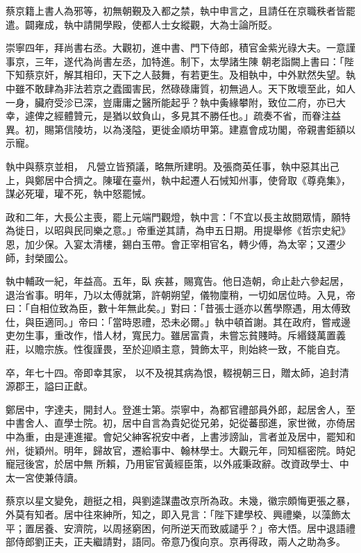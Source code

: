 \begin{pinyinscope}
 蔡京籍上書人為邪等，初無朝覲及入都之禁，執中申言之，且請任在京職秩者皆罷遣。闢雍成，執中請開學殿，使都人士女縱觀，大為士論所貶。



 崇寧四年，拜尚書右丞。大觀初，進中書、門下侍郎，積官金紫光祿大夫。一意謹事京，三年，遂代為尚書左丞，加特進。制下，太學諸生陳
 朝老詣闕上書曰：「陛下知蔡京奸，解其相印，天下之人鼓舞，有若更生。及相執中，中外默然失望。執中雖不敢肆為非法若京之蠹國害民，然碌碌庸質，初無過人。天下敗壞至此，如人一身，臟府受沴已深，豈庸庸之醫所能起乎？執中夤緣攀附，致位二府，亦已大幸，遽俾之經體贊元，是猶以蚊負山，多見其不勝任也。」疏奏不省，而眷注益異。初，賜第信陵坊，以為淺隘，更徙金順坊甲第。建嘉會成功閣，帝親書鉅額以示寵。



 執中與蔡京並相，
 凡營立皆預議，略無所建明。及張商英任事，執中惡其出己上，與鄭居中合擠之。陳瓘在臺州，執中起遷人石悈知州事，使脅取《尊堯集》，謀必死瓘，瓘不死，執中怒罷悈。



 政和二年，大長公主喪，罷上元端門觀燈，執中言：「不宜以長主故閼眾情，願特為徙日，以昭與民同樂之意。」帝重逆其請，為申五日期。用提舉修《哲宗史紀》恩，加少保。入宴太清樓，錫白玉帶。會正宰相官名，轉少傅，為太宰；又遷少師，封榮國公。



 執中輔政一紀，年益高。五年，臥
 疾甚，賜寬告。他日造朝，命止赴六參起居，退治省事。明年，乃以太傅就第，許朝朔望，儀物廩稍，一切如居位時。入見，帝曰：「自相位致為臣，數十年無此矣。」對曰：「昔張士遜亦以舊學際遇，用太傅致仕，與臣適同。」帝曰：「當時恩禮，恐未必爾。」執中頓首謝。其在政府，嘗戒邊吏勿生事，重改作，惜人材，寬民力。雖居富貴，未嘗忘貧賤時。斥緡錢萬置義莊，以贍宗族。性復謹畏，至於迎順主意，贊飾太平，則始終一致，不能自克。



 卒，年七十四。帝即幸其家，
 以不及視其病為恨，輟視朝三日，贈太師，追封清源郡王，謚曰正獻。



 鄭居中，字達夫，開封人。登進士第。崇寧中，為都官禮部員外郎，起居舍人，至中書舍人、直學士院。初，居中自言為貴妃從兄弟，妃從蕃邸進，家世微，亦倚居中為重，由是連進擢。會妃父紳客祝安中者，上書涉謗訕，言者並及居中，罷知和州，徙穎州。明年，歸故官，遷給事中、翰林學士。大觀元年，同知樞密院。時妃寵冠後宮，於居中無
 所賴，乃用宦官黃經臣策，以外戚秉政辭。改資政學士、中太一宮使兼侍讀。



 蔡京以星文變免，趙挺之相，與劉逵謀盡改京所為政。未幾，徽宗頗悔更張之暴，外莫有知者。居中往來紳所，知之，即入見言：「陛下建學校、興禮樂，以藻飾太平；置居養、安濟院，以周拯窮困，何所逆天而致威譴乎？」帝大悟。居中退語禮部侍郎劉正夫，正夫繼請對，語同。帝意乃復向京。京再得政，兩人之助為多。




\end{pinyinscope}
